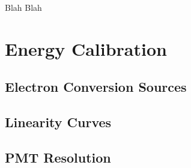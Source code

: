 Blah Blah


\section{Energy Calibration}
\subsection{Electron Conversion Sources}
\subsection{Linearity Curves}
\subsection{PMT Resolution}








